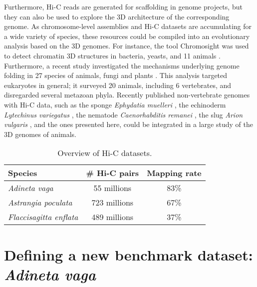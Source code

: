 Furthermore, Hi-C reads are generated for scaffolding in genome projects, but they can also be used to explore the 3D architecture of the corresponding genome. As chromosome-level assemblies and Hi-C datasets are accumulating for a wide variety of species, these resources could be compiled into an evolutionary analysis based on the 3D genomes. For instance, the tool Chromosight was used to detect chromatin 3D structures in bacteria, yeasts, and 11 animals \cite{chromosight}. Furthermore, a recent study investigated the mechanisms underlying genome folding in 27 species of animals, fungi and plants \cite{hic_genomes}. This analysis targeted eukaryotes in general; it surveyed 20 animals, including 6 vertebrates, and disregarded several metazoan phyla. Recently published non-vertebrate genomes with Hi-C data, such as the sponge \textit{Ephydatia muelleri} \cite{ephydatia_mulleri}, the echinoderm \textit{Lytechinus variegatus} \cite{lytechinus_variegatus}, the nematode \textit{Caenorhabditis remanei} \cite{caenorhabditis_remanei2}, the slug \textit{Arion vulgaris} \cite{arion_vulgaris}, and the ones presented here, could be integrated in a large study of the 3D genomes of animals. \\

\begin{table}
\centering
\begin{tabular}{lcc}
\hline
\textbf{Species} & \textbf{\# Hi-C pairs} & \textbf{Mapping rate} \\
\hline
\textit{Adineta vaga} & 55 millions & 83\% \\
\textit{Astrangia poculata} & 723 millions & 67\% \\
\textit{Flaccisagitta enflata} & 489 millions & 37\% \\
\hline
\end{tabular}
\caption{Overview of Hi-C datasets.}
\label{tab:hic_data}
\end{table}

\section{Defining a new benchmark dataset: \textit{Adineta vaga}}

